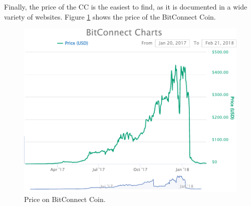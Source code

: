 \noindent Finally, the price of the CC is the easiest to find, as it is documented in a wide variety of websites. Figure \ref{img-pricebcc} shows the price of the BitConnect Coin.

\begin{figure}[H]
	\centering
    \includegraphics[scale=0.7]{files/Price_bCC.pdf}
    \caption{Price on BitConnect Coin.}
    \label{img-pricebcc}
\end{figure}



